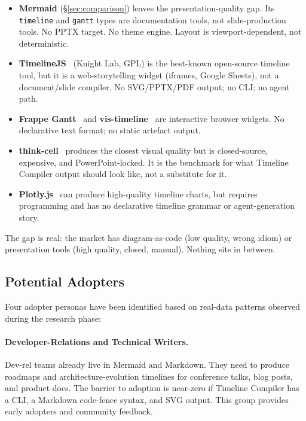 \begin{itemize}
  \item \textbf{Mermaid} (\S\ref{sec:comparison}) leaves the presentation-quality
        gap.  Its \texttt{timeline} and \texttt{gantt} types are documentation
        tools, not slide-production tools.  No PPTX target.  No theme engine.
        Layout is viewport-dependent, not deterministic.

  \item \textbf{TimelineJS}~\cite{timelinejs} (Knight Lab, GPL) is the
        best-known open-source timeline tool, but it is a web-storytelling
        widget (iframes, Google Sheets), not a document/slide compiler.
        No SVG/PPTX/PDF output; no CLI; no agent path.

  \item \textbf{Frappe Gantt}~\cite{frappegantt} and
        \textbf{vis-timeline}~\cite{vistimeline} are interactive browser
        widgets.  No declarative text format; no static artefact output.

  \item \textbf{think-cell}~\cite{thinkcell} produces the closest visual
        quality but is closed-source, expensive, and PowerPoint-locked.
        It is the benchmark for what Timeline Compiler output should look like,
        not a substitute for it.

  \item \textbf{Plotly.js}~\cite{plotlyjs} can produce high-quality timeline
        charts, but requires programming and has no declarative timeline
        grammar or agent-generation story.
\end{itemize}

\noindent
The gap is real: the market has diagram-as-code (low quality, wrong idiom) or
presentation tools (high quality, closed, manual).
Nothing sits in between.

\subsection{Potential Adopters}
\label{sec:oss-adopters}

Four adopter personas have been identified based on real-data patterns observed
during the research phase:

\paragraph{Developer-Relations and Technical Writers.}
Dev-rel teams already live in Mermaid and Markdown.
They need to produce roadmaps and architecture-evolution timelines for
conference talks, blog posts, and product docs.
The barrier to adoption is near-zero if Timeline Compiler has a CLI, a
Markdown code-fence syntax, and SVG output.
This group provides early adopters and community feedback.

